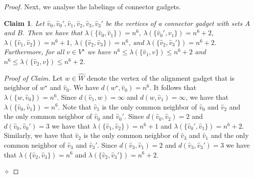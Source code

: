 \documentclass[11pt,a4paper]{article}
\newtheorem{claim}[theorem]{Claim}
\theoremstyle{remark}
\theoremstyle{definition}
\newenvironment{claimproof}{\noindent\emph{Proof of Claim.}}{\hfill$\diamond$

}
\begin{document}
\begin{proof}
Next, we analyse the labelings of connector gadgets.
\begin{claim}\label{claim:2}
    Let $\hat{v}_0,\hat{v}_0',\hat{v}_1,\hat{v}_2,\hat{v}_3,\hat{v}_3'$ be the vertices of a connector gadget with sets $A$ and $B$. Then we have that 
        $\lambda(\{\hat{v}_0,\hat{v}_1\})=n^6$,  $\lambda(\{\hat{v}_0',\hat{v}_1\})=n^6+2$,
        $\lambda(\{\hat{v}_1,\hat{v}_2\})=n^6+1$, $\lambda(\{\hat{v}_2,\hat{v}_3\})=n^6$, and $\lambda(\{\hat{v}_2,\hat{v}_3'\})=n^6+2$. 
        Furthermore, for all $v\in V^\star$ we have $n^6\le \lambda(\{\hat{v}_1,v\})\le n^6+2$ and $n^6\le \lambda(\{\hat{v}_2,v\}) \le n^6+2$.
\end{claim}
\begin{claimproof}
    Let $w\in \hat{W}$ denote the vertex of the alignment gadget that is neighbor of $w^\star$ and $\hat{v}_0$. We have $d(w^\star,\hat{v}_0)=n^6$. It follows that $\lambda(\{w,\hat{v}_0\})=n^6$. Since $d(\hat{v}_1,w)=\infty$ and $d(w,\hat{v}_1)=\infty$, we have that $\lambda(\{\hat{v}_0,\hat{v}_1\})=n^6$.
    Note that $\hat{v}_1$ is the only common neighbor of $\hat{v}_0$ and $\hat{v}_2$ and the only common neighbor of $\hat{v}_0$ and $\hat{v}_0'$. Since $d(\hat{v}_0,\hat{v}_2)=2$ and $d(\hat{v}_0,\hat{v}_0')=3$ we have that $\lambda(\{\hat{v}_1,\hat{v}_2\})=n^6+1$ and $\lambda(\{\hat{v}_0',\hat{v}_1\})=n^6+2$. Similarly, we have that $\hat{v}_2$ is the only common neighbor of $\hat{v}_3$ and $\hat{v}_1$ and the only common neighbor of $\hat{v}_3$ and $\hat{v}_3'$. Since $d(\hat{v}_3,\hat{v}_1)=2$ and $d(\hat{v}_3,\hat{v}_3')=3$ we have that $\lambda(\{\hat{v}_2,\hat{v}_3\})=n^6$ and $\lambda(\{\hat{v}_2,\hat{v}_3'\})=n^6+2$.


\end{claimproof}
\end{proof}
\end{document}
